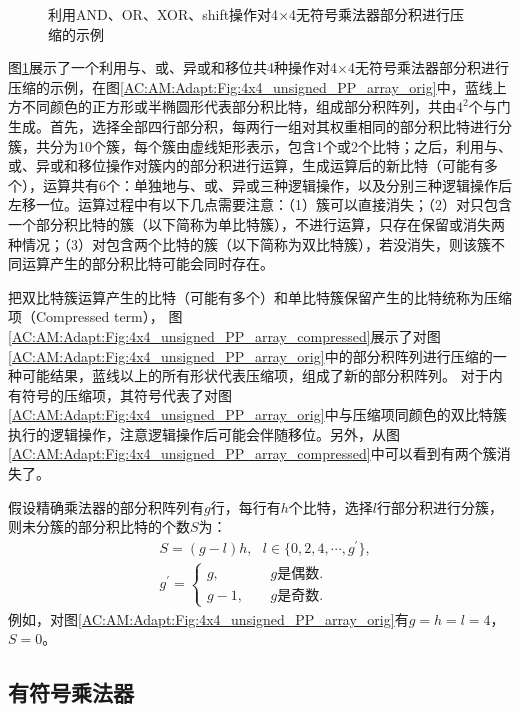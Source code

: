 \begin{figure}[ht]
{\begin{minipage}[t]{0.45\linewidth}
    \end{minipage}
    }
    \caption{利用AND、OR、XOR、shift操作对4$\times$4无符号乘法器部分积进行压缩的示例}
    \label{AC:AM:Adapt:Fig:4x4_unsigned}
\end{figure}

图\ref{AC:AM:Adapt:Fig:4x4_unsigned}展示了一个利用与、或、异或和移位共4种操作对4$\times$4无符号乘法器部分积进行压缩的示例，在图\ref{AC:AM:Adapt:Fig:4x4_unsigned_PP_array_orig}中，蓝线上方不同颜色的正方形或半椭圆形代表部分积比特，组成部分积阵列，共由$4^2$个与门生成。首先，选择全部四行部分积，每两行一组对其权重相同的部分积比特进行分簇，共分为10个簇，每个簇由虚线矩形表示，包含1个或2个比特；之后，利用与、或、异或和移位操作对簇内的部分积进行运算，生成运算后的新比特（可能有多个），运算共有6个：单独地与、或、异或三种逻辑操作，以及分别三种逻辑操作后左移一位。运算过程中有以下几点需要注意：（1）簇可以直接消失；（2）对只包含一个部分积比特的簇（以下简称为单比特簇），不进行运算，只存在保留或消失两种情况；（3）对包含两个比特的簇（以下简称为双比特簇），若没消失，则该簇不同运算产生的部分积比特可能会同时存在。

把双比特簇运算产生的比特（可能有多个）和单比特簇保留产生的比特统称为压缩项（Compressed term），
图\ref{AC:AM:Adapt:Fig:4x4_unsigned_PP_array_compressed}展示了对图\ref{AC:AM:Adapt:Fig:4x4_unsigned_PP_array_orig}中的部分积阵列进行压缩的一种可能结果，蓝线以上的所有形状代表压缩项，组成了新的部分积阵列。
对于内有符号的压缩项，其符号代表了对图\ref{AC:AM:Adapt:Fig:4x4_unsigned_PP_array_orig}中与压缩项同颜色的双比特簇执行的逻辑操作，注意逻辑操作后可能会伴随移位。另外，从图\ref{AC:AM:Adapt:Fig:4x4_unsigned_PP_array_compressed}中可以看到有两个簇消失了。

假设精确乘法器的部分积阵列有$g$行，每行有$h$个比特，选择$l$行部分积进行分簇，则未分簇的部分积比特的个数$S$为：
\begin{align}
        & S = ( g - l ) h, \ \ \ l \in \{0, 2, 4, \cdots, g^{\prime} \} \label{AC:AM:Adapt:Eq:unsigned_S}, \\
        & g^{\prime} = \left\{
    \begin{aligned}
      g, \ \ \  & \ \ \ \ \ g \text{是偶数}. \\
      g - 1, & \ \ \ \ \ g \text{是奇数}.
    \end{aligned}
  \right.
  \label{AC:AM:Adapt:Eq:unsigned_g}
\end{align}
例如，对图\ref{AC:AM:Adapt:Fig:4x4_unsigned_PP_array_orig}有$g=h=l=4$，$S=0$。

\subsection{有符号乘法器}

